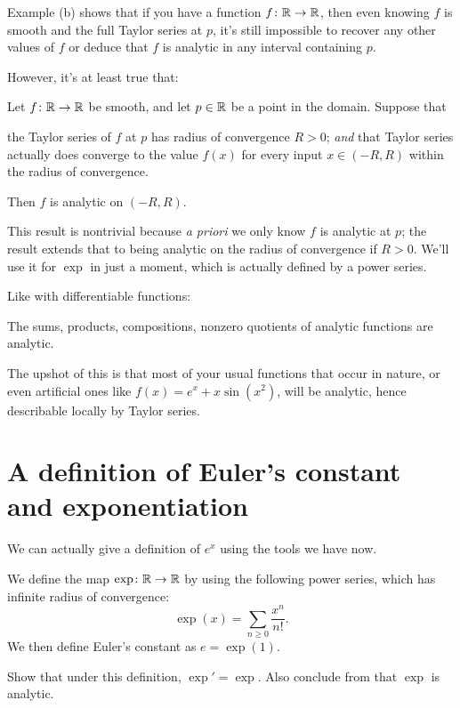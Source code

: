 Example (b) shows that if you have a function $f \colon \mathbb R \to \mathbb R$,
then even knowing $f$ is smooth and the full Taylor series at $p$,
it's still impossible to recover any other values of $f$
or deduce that $f$ is analytic in any interval containing $p$.

However, it's at least true that:
\begin{proposition}
	Let $f \colon \mathbb R \to \mathbb R$ be smooth, and let $p \in \mathbb R$ be a point in the domain.
	Suppose that
	\begin{itemize}
		\ii the Taylor series of $f$ at $p$ has radius of convergence $R > 0$; \emph{and}
		\ii that Taylor series actually does converge to the value $f(x)$
		for every input $x \in (-R,R)$ within the radius of convergence.
	\end{itemize}
	Then $f$ is analytic on $(-R, R)$.
	\label{prop:taylor_series_are_analytic}
\end{proposition}
This result is nontrivial because \emph{a priori} we only know $f$ is analytic at $p$;
the result extends that to being analytic on the radius of convergence if $R > 0$.
We'll use it for $\exp$ in just a moment, which is actually defined by a power series.

Like with differentiable functions:
\begin{proposition}
	The sums, products, compositions, nonzero quotients
	of analytic functions are analytic.
\end{proposition}
The upshot of this is that most of your usual
functions that occur in nature,
or even artificial ones like $f(x) = e^x + x \sin(x^2)$,
will be analytic, hence describable locally by Taylor series.

\section{A definition of Euler's constant and exponentiation}
We can actually give a definition of $e^x$ using the tools we have now.

\begin{definition}
	We define the map $\exp \colon \mathbb R \to \mathbb R$ by using the following power series,
	which has infinite radius of convergence:
	\[ \exp(x) = \sum_{n \ge 0} \frac{x^n}{n!}. \]
	We then define Euler's constant as $e = \exp(1)$.
\end{definition}
\begin{ques}
	Show that under this definition, $\exp' = \exp$.
	Also conclude from  that $\exp$ is analytic.
\end{ques}

